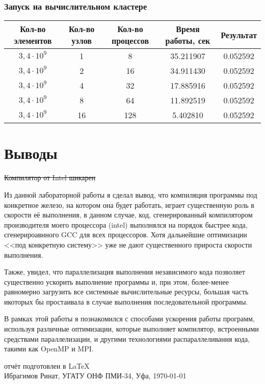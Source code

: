 \documentclass[a4paper,12pt]{article}
\begin{document}
\subsubsection{Запуск на вычислительном кластере}
\begin{tabular}{c | c | c c c}
\textbf{Кол-во элементов} & \textbf{Кол-во узлов} & \textbf{Кол-во процессов} & \textbf{Время работы, сек} & \textbf{Результат}\\
\hline
$3,4\cdot 10^9$ & 1 & 8 & 35.211907 & 0.052592\\
$3,4\cdot 10^9$ & 2 & 16 & 34.911430 & 0.052592\\
$3,4\cdot 10^9$ & 4 & 32 & 17.885916 & 0.052592\\
$3,4\cdot 10^9$ & 8 & 64 & 11.892519 & 0.052592\\
$3,4\cdot 10^9$ & 16 & 128 & 5.402810 & 0.052592\\
\hline
\end{tabular}

\newpage
\section{Выводы}
\sout{Компилятор от Intel шикарен}

Из данной лабораторной работы я сделал вывод, что компиляция программы под конкретное железо, на котором она будет работать, играет существенную роль в скорости её выполнения, в данном случае, код, сгенерированный компилятором производителя моего процессора (intel) выполнялся на порядок быстрее кода, сгенерироавнного GCC для всех процессоров. Хотя дальнейшие оптимизации <<под конкретную систему>> уже не дают существенного прироста скорости выполнения.

Также, увидел, что параллелизация выполнения независимого кода позволяет существенно ускорить выполнение программы и, при этом, более-менее равномерно загрузить все системные вычислительные ресурсы, большая часть икоторых бы простаивала в случае выполнения последовательной программы.

В рамках этой работы я познакомился с способами ускорения работы программ, используя различные оптимизации, которые выполняет компилятор, встроенными средствами параллелизации, и другими технологиями распараллеливания кода, такими как OpenMP и MPI.
\vfill
\begin{center}
\small отчёт подготовлен в \LaTeX\\
Ибрагимов Ринат, УГАТУ ОНФ ПМИ-34, Уфа, \today
\end{center}
\end{document}
